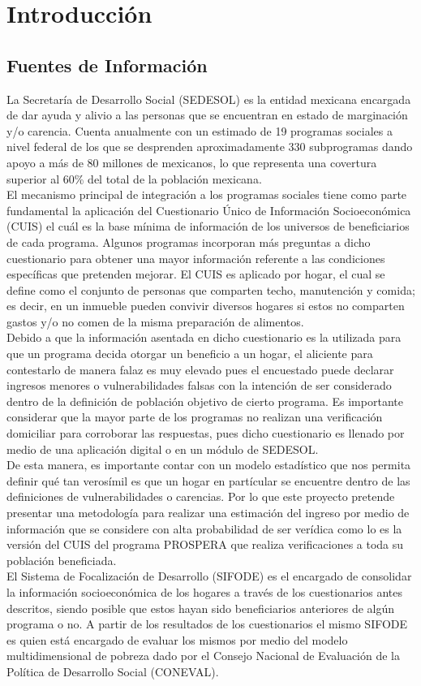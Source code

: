 \chapter{Introducción}
\section{Fuentes de Información}
La Secretaría de Desarrollo Social (SEDESOL) es la entidad mexicana encargada de dar ayuda y alivio a las personas que se encuentran en estado de marginación y/o carencia. Cuenta anualmente con un estimado de 19 programas sociales a nivel federal de los que se desprenden aproximadamente 330 subprogramas dando apoyo a más de 80 millones de mexicanos, lo que representa una covertura superior al 60\% del total de la población mexicana.\\
El mecanismo principal de integración a los programas sociales tiene como parte fundamental la aplicación del Cuestionario Único de Información Socioeconómica (CUIS)\cite{cuis} el cuál es la base mínima de información de los universos de beneficiarios de cada programa. Algunos programas incorporan más preguntas a dicho cuestionario para obtener una mayor información referente a las condiciones específicas que pretenden mejorar. El CUIS es aplicado por hogar, el cual se define como el conjunto de personas que comparten techo, manutención y comida; es decir, en un inmueble pueden convivir diversos hogares si estos no comparten gastos y/o no comen de la misma preparación de alimentos.\\
Debido a que la información asentada en dicho cuestionario es la utilizada para que un programa decida otorgar un beneficio a un hogar, el aliciente para contestarlo de manera falaz es muy elevado pues el encuestado puede declarar ingresos menores o vulnerabilidades falsas con la intención de ser considerado dentro de la definición de población objetivo de cierto programa. Es importante considerar que la mayor parte de los programas no realizan una verificación domiciliar para corroborar las respuestas, pues dicho cuestionario es llenado por medio de una aplicación digital o en un módulo de SEDESOL.\\
De esta manera, es importante contar con un modelo estadístico que nos permita definir qué tan verosímil es que un hogar en partícular se encuentre dentro de las definiciones de vulnerabilidades o carencias. Por lo que este proyecto pretende presentar una metodología para realizar una estimación del ingreso por medio de información que se considere con alta probabilidad de ser verídica como lo es la versión del CUIS del programa PROSPERA\cite{prospera} que realiza verificaciones a toda su población beneficiada.\\
El Sistema de Focalización de Desarrollo (SIFODE) es el encargado de consolidar la información socioeconómica de los hogares a través de los cuestionarios antes descritos, siendo posible que estos hayan sido beneficiarios anteriores de algún programa o no. A partir de los resultados de los cuestionarios el mismo SIFODE es quien está encargado de evaluar los mismos por medio del modelo multidimensional de pobreza dado por el Consejo Nacional de Evaluación de la Política de Desarrollo Social (CONEVAL)\cite{multidimensional}.
